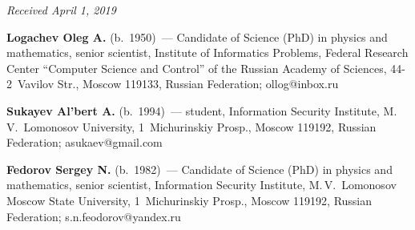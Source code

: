 \vspace*{-6pt}

\hfill{\small\textit{Received April 1, 2019}}




\Contr


\noindent
\textbf{Logachev Oleg A.} (b.\ 1950)~--- 
Candidate of Science (PhD) in physics and mathematics, senior scientist, Institute 
of Informatics Problems, Federal Research Center ``Computer Science and Control'' 
of the Russian Academy of Sciences, 44-2~Vavilov Str., Moscow 119133, 
Russian Federation; \mbox{ollog@inbox.ru}

\vspace*{3pt}


\noindent
\textbf{Sukayev Al'bert A.} (b.\ 1994)~--- 
student, Information Security Institute, M.\,V.~Lomonosov University, 
1~Michurinskiy Prosp., Moscow 119192, Russian Federation; \mbox{asukaev@gmail.com}

\vspace*{3pt}


\noindent
\textbf{Fedorov Sergey N.} (b.\ 1982)~--- 
Candidate of Science (PhD) in physics and mathematics, senior scientist, 
Information Security Institute, M.\,V.~Lomonosov Moscow State University, 
1~Michurinskiy Prosp., Moscow 119192, Russian Federation; 
\mbox{s.n.feodorov@yandex.ru}
\label{end\stat}

\renewcommand{\bibname}{\protect\rm Литература}